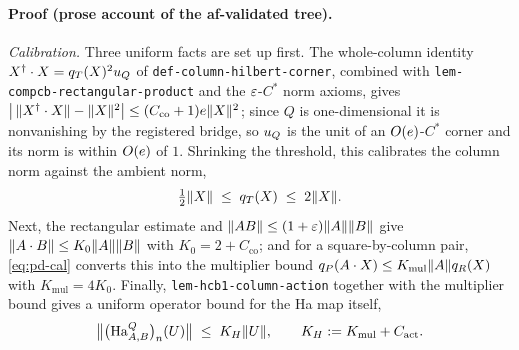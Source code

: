 \paragraph{Proof (prose account of the af-validated tree).}
\emph{Calibration.} Three uniform facts are set up first. The whole-column identity
$X^{\dagger}\mathbin{\cdot} X=q_{T}(X)^{2}u_{Q}$ of \texttt{def-column-hilbert-corner}, combined with
\texttt{lem-compcb-rectangular-product} and the $\varepsilon$-$C^*$ norm axioms, gives
$\bigl\lvert\,\lVert X^{\dagger}\mathbin{\cdot} X\rVert-\lVert X\rVert^{2}\bigr\rvert\le(C_{\mathrm{co}}+1)e\lVert X\rVert^{2}$;
since $Q$ is one-dimensional it is nonvanishing by the registered bridge, so
$u_{Q}$ is the unit of an $O(e)$-$C^*$ corner and its norm is within
$O(e)$ of $1$. Shrinking the threshold, this calibrates the column norm against the
ambient norm,
\begin{equation}\label{eq:pd-cal}
  \tfrac12\lVert X\rVert\;\le\;q_{T}(X)\;\le\;2\lVert X\rVert.
\end{equation}
Next, the rectangular estimate and $\lVert AB\rVert\le(1+\varepsilon)\lVert A\rVert\lVert B\rVert$ give
$\lVert A\mathbin{\cdot} B\rVert\le K_0\lVert A\rVert\lVert B\rVert$ with $K_0=2+C_{\mathrm{co}}$; and for a
square-by-column pair, \eqref{eq:pd-cal} converts this into the multiplier bound
$q_{P}(A\mathbin{\cdot} X)\le K_{\mathrm{mul}}\lVert A\rVert q_{R}(X)$ with
$K_{\mathrm{mul}}=4K_0$. Finally, \texttt{lem-hcb1-column-action} together with the
multiplier bound gives a uniform operator bound for the Ha map itself,
\begin{equation}\label{eq:pd-opbound}
  \bigl\lVert\bigl(\mathrm{Ha}^{Q}_{A,B}\bigr)_{n}(U)\bigr\rVert\;\le\;K_H\lVert U\rVert,
  \qquad K_H:=K_{\mathrm{mul}}+C_{\mathrm{act}} .
\end{equation}


